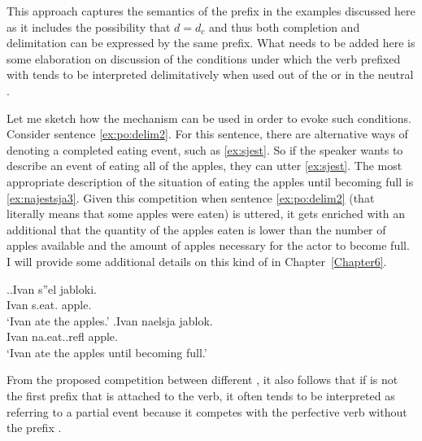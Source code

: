 This approach captures the semantics of the prefix in the examples discussed here as it includes the possibility that $d = d_c$ and thus both completion and delimitation can be expressed by the same prefix. What needs to be added here is some elaboration on discussion of the conditions under which the verb prefixed with  tends to be interpreted delimitatively when used out of the  or in the neutral .

Let me sketch how the  mechanism can be used in order to evoke such conditions. Consider sentence \ref{ex:po:delim2}. For this sentence, there are alternative ways of denoting a completed eating event, such as \ref{ex:sjest}. So if the speaker wants to describe an event of eating all of the apples, they can utter \ref{ex:sjest}. The most appropriate description of the situation of eating the apples until becoming full is \ref{ex:najestsja3}. Given this competition when sentence \ref{ex:po:delim2} (that literally means that some apples were eaten) is uttered, it gets enriched with an additional  that the quantity of the apples eaten is lower than the number of apples available and the amount of apples necessary for the actor to become full. I will provide some additional details on this kind of  in Chapter~\ref{Chapter6}.

\ex.\ag.\label{ex:sjest}Ivan s''el jabloki.\\
Ivan s.eat. apple.\\
\trans `Ivan ate the apples.'
\bg.\label{ex:najestsja3}Ivan naelsja jablok.\\
Ivan na.eat..refl apple.\\
\trans `Ivan ate the apples until becoming full.'

From the proposed competition between different , it also follows that if  is not the first prefix that is attached to the verb, it often tends to be interpreted as referring to a partial event because it competes with the perfective verb without the prefix .


